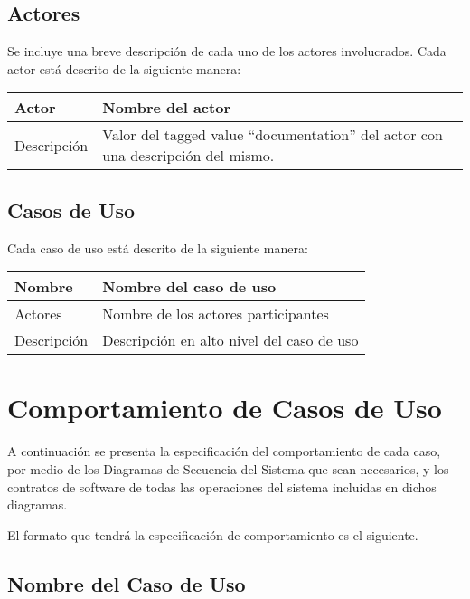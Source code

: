 \documentclass[10pt,spanish]{article}
\numberwithin{figure}{section} %
\begin{document}
\subsection{Actores}
\begin{siderules}
Se incluye una breve descripción de cada uno de los actores involucrados. Cada actor está descrito de la siguiente manera:\\[10px]
\begin{tabularx}{\textwidth}{| l | X @{}| } %
    \hline
    Actor & Nombre del actor \\ \hline
    Descripción & Valor del tagged value ``documentation'' del actor con una descripción del mismo. \\ \hline
\end{tabularx}
\end{siderules}

\subsection{Casos de Uso}
\begin{siderules}
Cada caso de uso está descrito de la siguiente manera:\\[10px]
\begin{tabularx}{\textwidth}{| l | X @{}| } %
    \hline
    Nombre & Nombre del caso de uso \\ \hline
    Actores & Nombre de los actores participantes \\ \hline
    Descripción & Descripción en alto nivel del caso de uso \\ \hline
\end{tabularx}
\end{siderules}

\section{Comportamiento de Casos de Uso}
A continuación se presenta la especificación del comportamiento de cada caso, por medio de los Diagramas de Secuencia del Sistema que sean necesarios, y los contratos de software de todas las operaciones del sistema incluidas en dichos diagramas.

El formato que tendrá la especificación de comportamiento es el siguiente.

\subsection{Nombre del Caso de Uso}
\end{document}
